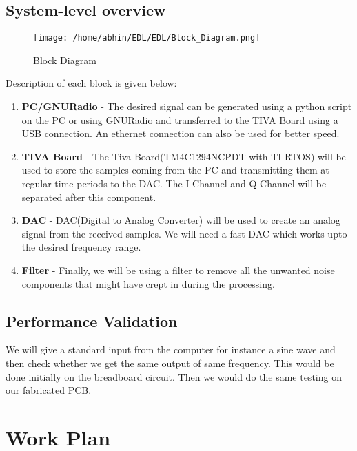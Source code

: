 \documentclass{article}
\begin{document}
\subsection{System-level overview}
\begin{figure}[htp]
\centering
\texttt{[image: /home/abhin/EDL/EDL/Block\_Diagram.png]}
\caption{Block Diagram}
\label{}
\end{figure}
Description of each block is given below:
\begin{enumerate}
\item \textbf{PC/GNURadio} - The desired signal can be generated using a python script on the PC or using GNURadio and transferred to the TIVA Board using a USB connection. An ethernet connection can also be used for better speed.
\item \textbf{TIVA Board} - The Tiva Board(TM4C1294NCPDT with TI-RTOS) will be used to store the samples coming from the PC and transmitting them at regular time periods to the DAC. The I Channel and Q Channel will be separated after this component.
\item \textbf{DAC} - DAC(Digital to Analog Converter) will be used to create an analog signal from the received samples. We will need a fast DAC which works upto the desired frequency range.
\item \textbf{Filter} - Finally, we will be using a filter to remove all the unwanted noise components that might have crept in during the processing.
\end{enumerate}

\subsection{Performance Validation}
We will give a standard input from the computer for instance a sine wave and then check whether we get the same output of same frequency. This would be done initially on the breadboard circuit. Then we would do the same testing on our fabricated PCB.

\section{Work Plan}
\end{document}
